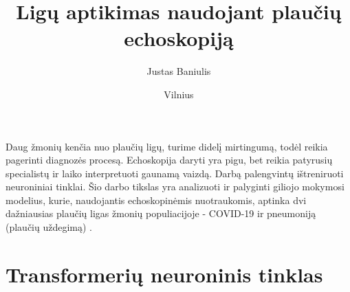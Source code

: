 \documentclass[fleqn]{VUMIFKompMagistrinis}
\institute{Informatikos institutas}  %
\title{Ligų aptikimas naudojant plaučių echoskopiją}
\author{Justas Baniulis}
\date{Vilnius \\ \the\year}
\begin{document}
\maketitle

\tableofcontents




Daug žmonių kenčia nuo plaučių ligų, turime didelį mirtingumą, todėl reikia pagerinti diagnozės procesą. Echoskopija daryti yra pigu, bet reikia patyrusių specialistų ir laiko interpretuoti gaunamą vaizdą. Darbą palengvintų ištreniruoti neuroniniai tinklai. Šio darbo tikslas yra analizuoti ir palyginti giliojo mokymosi modelius, kurie, naudojantis echoskopinėmis nuotraukomis, aptinka dvi dažniausias plaučių ligas žmonių populiacijoje - COVID-19 ir pneumoniją (plaučių uždegimą) . 



\section{Transformerių neuroninis tinklas}
\end{document}
